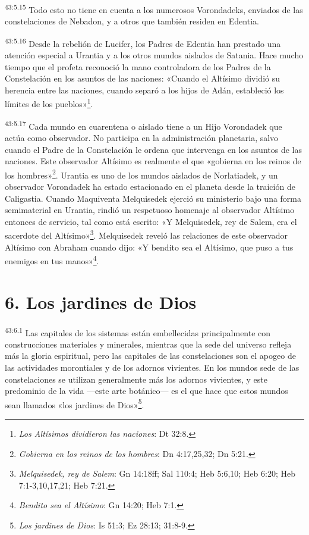 \par
\textsuperscript{43:5.15} Todo esto no tiene en cuenta a los numerosos Vorondadeks, enviados de las constelaciones de Nebadon, y a otros que también residen en Edentia.

\par
\textsuperscript{43:5.16} Desde la rebelión de Lucifer, los Padres de Edentia han prestado una atención especial a Urantia y a los otros mundos aislados de Satania. Hace mucho tiempo que el profeta reconoció la mano controladora de los Padres de la Constelación en los asuntos de las naciones: «Cuando el Altísimo dividió su herencia entre las naciones, cuando separó a los hijos de Adán, estableció los límites de los pueblos»\footnote{\textit{Los Altísimos dividieron las naciones}: Dt 32:8.}.

\par
\textsuperscript{43:5.17} Cada mundo en cuarentena o aislado tiene a un Hijo Vorondadek que actúa como observador. No participa en la administración planetaria, salvo cuando el Padre de la Constelación le ordena que intervenga en los asuntos de las naciones. Este observador Altísimo es realmente el que «gobierna en los reinos de los hombres»\footnote{\textit{Gobierna en los reinos de los hombres}: Dn 4:17,25,32; Dn 5:21.}. Urantia es uno de los mundos aislados de Norlatiadek, y un observador Vorondadek ha estado estacionado en el planeta desde la traición de Caligastia. Cuando Maquiventa Melquisedek ejerció su ministerio bajo una forma semimaterial en Urantia, rindió un respetuoso homenaje al observador Altísimo entonces de servicio, tal como está escrito: «Y Melquisedek, rey de Salem, era el sacerdote del Altísimo»\footnote{\textit{Melquisedek, rey de Salem}: Gn 14:18ff; Sal 110:4; Heb 5:6,10; Heb 6:20; Heb 7:1-3,10,17,21; Heb 7:21.}. Melquisedek reveló las relaciones de este observador Altísimo con Abraham cuando dijo: «Y bendito sea el Altísimo, que puso a tus enemigos en tus manos»\footnote{\textit{Bendito sea el Altísimo}: Gn 14:20; Heb 7:1.}.

\section*{6. Los jardines de Dios}
\par
\textsuperscript{43:6.1} Las capitales de los sistemas están embellecidas principalmente con construcciones materiales y minerales, mientras que la sede del universo refleja más la gloria espiritual, pero las capitales de las constelaciones son el apogeo de las actividades morontiales y de los adornos vivientes. En los mundos sede de las constelaciones se utilizan generalmente más los adornos vivientes, y este predominio de la vida ---este arte botánico--- es el que hace que estos mundos sean llamados «los jardines de Dios»\footnote{\textit{Los jardines de Dios}: Is 51:3; Ez 28:13; 31:8-9.}.


